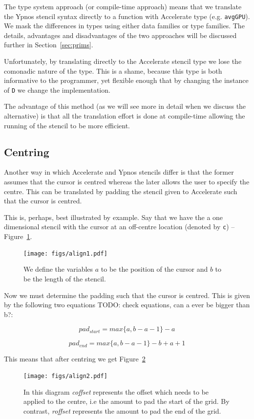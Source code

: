\documentclass[12pt,a4paper,twoside]{scrbook}
\begin{document}
The type system approach (or compile-time approach) means that we translate the
Ypnos stencil syntax directly to a function with Accelerate type
(e.g. \texttt{avgGPU}). We mask the differences in types using either data
families or type families. The details, advantages and disadvantages of the two
approaches will be discussed further in Section~\ref{sec:prims}.

Unfortunately, by translating directly to the Accelerate stencil type we lose
the comonadic nature of the type. This is a shame, because this type is both
informative to the programmer, yet flexible enough that by changing the instance
of \texttt{D} we change the implementation.

The advantage of this method (as we will see more in detail when we discuss the
alternative) is that all the translation effort is done at compile-time allowing
the running of the stencil to be more efficient.

\subsection{Centring}
\label{sec:centring}

Another way in which Accelerate and Ypnos stencils differ is that the former
assumes that the cursor is centred whereas the later allows the user to specify
the centre. This can be translated by padding the stencil given to Accelerate
such that the cursor is centred.

This is, perhaps, best illustrated by example. Say that we have the a one
dimensional stencil with the cursor at an off-centre location (denoted by
\texttt{c}) -- Figure~\ref{fig:cursor}.

\begin{figure}[tb]
  \centering
  \texttt{[image: figs/align1.pdf]}
  \caption{We define the variables $a$ to be the position of the cursor and $b$
    to be the length of the stencil.}
  \label{fig:cursor}
\end{figure}

Now we must determine the padding such that the cursor is centred. This is given
by the following two equations TODO: check equations, can a ever be bigger than b?:

\[ pad_{start} = max \{a, b-a-1\} - a \]

\[ pad_{end} = max \{a, b-a-1\} - b + a + 1 \]

This means that after centring we get Figure~\ref{fig:centredcursor}

\begin{figure}[tb]
  \centering
  \texttt{[image: figs/align2.pdf]}
  \caption{In this diagram \emph{coffset} represents the offset which needs to
    be applied to the centre, i.e the amount to pad the start of the grid. By
    contrast, \emph{roffset} represents the amount to pad the end of the grid.}
  \label{fig:centredcursor}
\end{figure}
\end{document}
